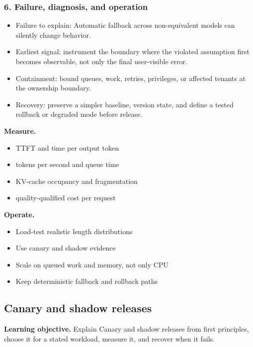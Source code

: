 \subsubsection*{6. Failure, diagnosis, and operation}
\begin{itemize}
\item Failure to explain: Automatic fallback across non-equivalent models can silently change behavior.
\item Earliest signal: instrument the boundary where the violated assumption first becomes observable, not only the final user-visible error.
\item Containment: bound queues, work, retries, privileges, or affected tenants at the ownership boundary.
\item Recovery: preserve a simpler baseline, version state, and define a tested rollback or degraded mode before release.
\end{itemize}
\textbf{Measure.}\begin{itemize}
\item TTFT and time per output token
\item tokens per second and queue time
\item KV-cache occupancy and fragmentation
\item quality-qualified cost per request
\end{itemize}
\textbf{Operate.}\begin{itemize}
\item Load-test realistic length distributions
\item Use canary and shadow evidence
\item Scale on queued work and memory, not only CPU
\item Keep deterministic fallback and rollback paths
\end{itemize}
\subsection{Canary and shadow releases}
\textbf{Learning objective.} Explain Canary and shadow releases from first principles, choose it for a stated workload, measure it, and recover when it fails.

